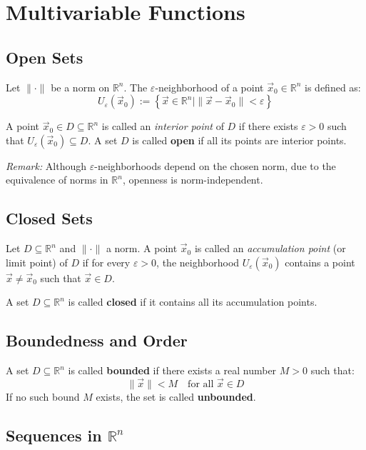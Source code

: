 \section{Multivariable Functions}

\subsection{Open Sets}

Let \( \| \cdot \| \) be a norm on \( \mathbb{R}^n \). The \( \varepsilon \)-neighborhood of a point \( \vec{x}_0 \in \mathbb{R}^n \) is defined as:
\[
U_\varepsilon(\vec{x}_0) := \left\{ \vec{x} \in \mathbb{R}^n \mid \| \vec{x} - \vec{x}_0 \| < \varepsilon \right\}
\]

A point \( \vec{x}_0 \in D \subseteq \mathbb{R}^n \) is called an \emph{interior point} of \( D \) if there exists \( \varepsilon > 0 \) such that \( U_\varepsilon(\vec{x}_0) \subseteq D \).  
A set \( D \) is called \textbf{open} if all its points are interior points.

\textit{Remark:} Although \( \varepsilon \)-neighborhoods depend on the chosen norm, due to the equivalence of norms in \( \mathbb{R}^n \), openness is norm-independent.


\subsection{Closed Sets}

Let \( D \subseteq \mathbb{R}^n \) and \( \| \cdot \| \) a norm. A point \( \vec{x}_0 \) is called an \emph{accumulation point} (or limit point) of \( D \) if for every \( \varepsilon > 0 \), the neighborhood \( U_\varepsilon(\vec{x}_0) \) contains a point \( \vec{x} \ne \vec{x}_0 \) such that \( \vec{x} \in D \).

A set \( D \subseteq \mathbb{R}^n \) is called \textbf{closed} if it contains all its accumulation points.

\subsection{Boundedness and Order}

A set \( D \subseteq \mathbb{R}^n \) is called \textbf{bounded} if there exists a real number \( M > 0 \) such that:
\[
\|\vec{x}\| < M \quad \text{for all } \vec{x} \in D
\]
If no such bound \( M \) exists, the set is called \textbf{unbounded}.


\subsection{Sequences in \( \mathbb{R}^n \)}

